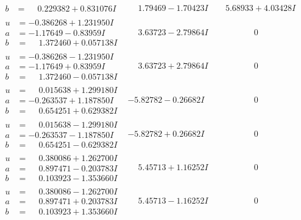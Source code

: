 \documentclass[1p]{elsarticle_modified}
\theoremstyle{definition}
\begin{document}
$$\begin{array}{c|c|c}
\begin{aligned}
b &= \phantom{-}0.229382 + 0.831076 I\end{aligned}
 & \phantom{-}1.79469 - 1.70423 I & \phantom{-}5.68933 + 4.03428 I \\ \hline\begin{aligned}
u &= -0.386268 + 1.231950 I \\
a &= -1.17649 - 0.83959 I \\
b &= \phantom{-}1.372460 + 0.057138 I\end{aligned}
 & \phantom{-}3.63723 - 2.79864 I & \phantom{-0.000000 } 0 \\ \hline\begin{aligned}
u &= -0.386268 - 1.231950 I \\
a &= -1.17649 + 0.83959 I \\
b &= \phantom{-}1.372460 - 0.057138 I\end{aligned}
 & \phantom{-}3.63723 + 2.79864 I & \phantom{-0.000000 } 0 \\ \hline\begin{aligned}
u &= \phantom{-}0.015638 + 1.299180 I \\
a &= -0.263537 + 1.187850 I \\
b &= \phantom{-}0.654251 + 0.629382 I\end{aligned}
 & -5.82782 - 0.26682 I & \phantom{-0.000000 } 0 \\ \hline\begin{aligned}
u &= \phantom{-}0.015638 - 1.299180 I \\
a &= -0.263537 - 1.187850 I \\
b &= \phantom{-}0.654251 - 0.629382 I\end{aligned}
 & -5.82782 + 0.26682 I & \phantom{-0.000000 } 0 \\ \hline\begin{aligned}
u &= \phantom{-}0.380086 + 1.262700 I \\
a &= \phantom{-}0.897471 - 0.203783 I \\
b &= \phantom{-}0.103923 - 1.353660 I\end{aligned}
 & \phantom{-}5.45713 + 1.16252 I & \phantom{-0.000000 } 0 \\ \hline\begin{aligned}
u &= \phantom{-}0.380086 - 1.262700 I \\
a &= \phantom{-}0.897471 + 0.203783 I \\
b &= \phantom{-}0.103923 + 1.353660 I\end{aligned}
 & \phantom{-}5.45713 - 1.16252 I & \phantom{-0.000000 } 0 \\ \hline\begin{aligned}

\end{aligned}
\end{array}$$
\end{document}
